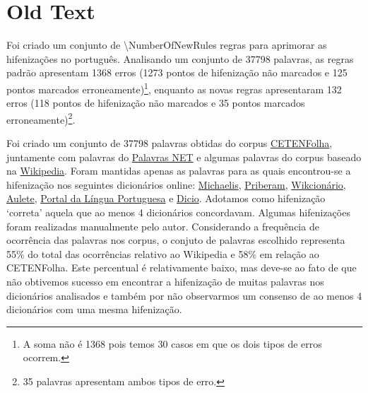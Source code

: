\documentclass{article}
\begin{document}
\section{Old Text}


Foi criado um conjunto de \num{\NumberOfNewRules} regras para aprimorar as hifenizações no
português. Analisando um conjunto de \num{37798} palavras, as regras padrão apresentam
1368 erros (1273 pontos de hifenização não marcados e 125 pontos marcados
erroneamente)\footnote{A soma não é 1368 pois temos 30 casos em que os dois
tipos de erros ocorrem.}, enquanto as novas regras apresentaram 132 erros (118
pontos de hifenização não marcados e 35 pontos marcados
erroneamente)\footnote{35 palavras apresentam ambos tipos de erro.}.

Foi criado um conjunto de 37798 palavras obtidas do corpus
\href{https://www.linguateca.pt/cetenfolha/index_info.html}{CETENFolha},
juntamente com palavras do \href{https://www.palavras.net/}{Palavras NET} e
algumas palavras do corpus baseado na
\href{https://pt.wikipedia.org}{Wikipedia}. 
Foram mantidas apenas as palavras
para as quais encontrou-se a hifenização nos seguintes dicionários online:
\href{https://michaelis.uol.com.br/}{Michaelis},
\href{https://dicionario.priberam.org/}{Priberam},
\href{https://pt.wiktionary.org}{Wikcionário},
\href{https://aulete.com.br/}{Aulete},
\href{http://www.portaldalinguaportuguesa.org/}{Portal da Língua Portuguesa} e
\href{https://www.dicio.com.br/}{Dicio}.
Adotamos como hifenização `correta' aquela que ao menos 4 dicionários
concordavam. Algumas hifenizações foram realizadas manualmente pelo autor.
Considerando a frequência de ocorrência das palavras nos corpus, o conjuto de
palavras escolhido representa 55\% do total das ocorrências relativo ao
Wikipedia e 58\% em relação ao CETENFolha.
%
% 
%
%
Este percentual é relativamente baixo, mas deve-se ao fato de que não obtivemos
sucesso em encontrar a hifenização de muitas palavras nos dicionários
analisados e também por não observarmos um consenso de ao menos 4 dicionários
com uma mesma hifenização.
\end{document}
